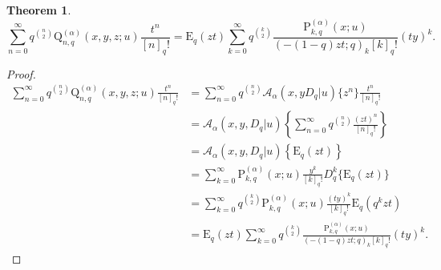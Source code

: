 \documentclass[12pt]{article}
\newcommand{\p}{\mathrm{P}}
\newcommand{\q}{\mathrm{Q}}
\newcommand{\E}{\mathrm{E}}
\newcommand{\Aa}{\mathscr{A}}
\newtheorem{theorem}{Theorem}
\begin{document}
\begin{theorem}
    \begin{equation}
        \sum_{n=0}^{\infty}q^{\binom{n}{2}}\q_{n,q}^{(\alpha)}(x,y,z;u)\frac{t^{n}}{[n]_{q}!}=\E_{q}(zt)\sum_{k=0}^{\infty}q^{\binom{k}{2}}\frac{\p_{k,q}^{(\alpha)}(x;u)}{(-(1-q)zt;q)_{k}[k]_{q}!}(ty)^{k}.
    \end{equation}
\end{theorem}
\begin{proof}
   \begin{align*}
       \sum_{n=0}^{\infty}q^{\binom{n}{2}}\q_{n,q}^{(\alpha)}(x,y,z;u)\frac{t^{n}}{[n]_{q}!}&=\sum_{n=0}^{\infty}q^{\binom{n}{2}}\Aa_{\alpha}(x,yD_{q}|u)\{z^{n}\}\frac{t^{n}}{[n]_{q}!}\\
       &=\Aa_{\alpha}(x,y,D_{q}|u)\left\{\sum_{n=0}^{\infty}q^{\binom{n}{2}}\frac{(zt)^n}{[n]_{q}!}\right\}\\
       &=\Aa_{\alpha}(x,y,D_{q}|u)\left\{\E_{q}(zt)\right\}\\
       &=\sum_{k=0}^{\infty}\p_{k,q}^{(\alpha)}(x;u)\frac{y^{k}}{[k]_{q}!}D_{q}^{k}\{\E_{q}(zt)\}\\
       &=\sum_{k=0}^{\infty}q^{\binom{k}{2}}\p_{k,q}^{(\alpha)}(x;u)\frac{(ty)^{k}}{[k]_{q}!}\E_{q}(q^kzt)\\
       &=\E_{q}(zt)\sum_{k=0}^{\infty}q^{\binom{k}{2}}\frac{\p_{k,q}^{(\alpha)}(x;u)}{(-(1-q)zt;q)_{k}[k]_{q}!}(ty)^{k}.
   \end{align*} 
\end{proof}
\end{document}
